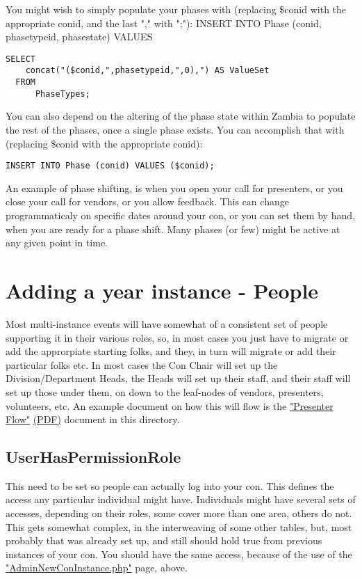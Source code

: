\documentclass[captions=tablesignature]{scrartcl}
\begin{document}
You might wish to simply populate your phases with (replacing
\$conid with the appropriate conid, and the last "," with ";"):
INSERT INTO Phase (conid, phasetypeid, phasestate) VALUES
\begin{verbatim}
SELECT
    concat("($conid,",phasetypeid,",0),") AS ValueSet
  FROM
      PhaseTypes;
\end{verbatim}
You can also depend on the altering of the phase state within
Zambia to populate the rest of the phases, once a single phase
exists. You can accomplish that with (replacing \$conid with the
appropriate conid):
\begin{verbatim}
INSERT INTO Phase (conid) VALUES ($conid);
\end{verbatim}

An example of phase shifting, is when you open your call for
presenters, or you close your call for vendors, or you allow
feedback.  This can change programmaticaly on specific dates around
your con, or you can set them by hand, when you are ready for a
phase shift.  Many phases (or few) might be active at any given
point in time.

\section{Adding a year instance - People}
\label{sec-12}

Most multi-instance events will have somewhat of a consistent set of
people supporting it in their various roles, so, in most cases you
just have to migrate or add the approrpiate starting folks, and
they, in turn will migrate or add their particular folks etc.  In
most cases the Con Chair will set up the Division/Department Heads,
the Heads will set up their staff, and their staff will set up those
under them, on down to the leaf-nodes of vendors, presenters,
volunteers, etc.  An example document on how this will flow is the
\href{./Presenter_Flow.html}{"Presenter Flow"} \href{./Presenter_Flow.pdf}{(PDF)} document in this directory.
\subsection{UserHasPermissionRole}
\label{sec-12-1}

This need to be set so people can actually log into your con.  This
defines the access any particular individual might have.
Individuals might have several sets of accesses, depending on their
roles, some cover more than one area, others do not.  This gets
somewhat complex, in the interweaving of some other tables, but,
most probably that was already set up, and still should hold true from
previous instances of your con.  You should have the same access,
because of the use of the \href{../webpages/AdminNewConInstance.php}{"AdminNewConInstance.php"} page, above.
\end{document}
